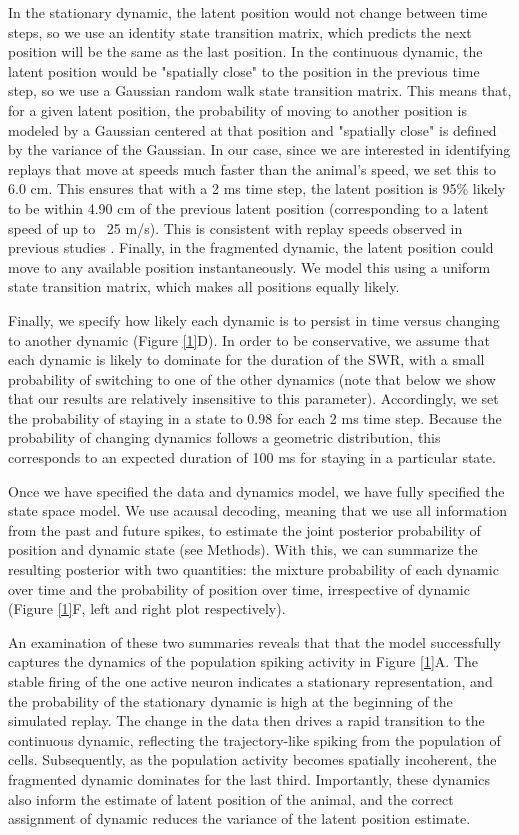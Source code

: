 \documentclass[times, twoside]{zHenriquesLab-StyleBioRxiv}
\begin{document}
In the stationary dynamic, the latent position would not change between time steps, so we use an identity state transition matrix, which predicts the next position will be the same as the last position. In the continuous dynamic, the latent position would be "spatially close" to the position in the previous time step, so we use a Gaussian random walk state transition matrix. This means that, for a given latent position, the probability of moving to another position is modeled by a Gaussian centered at that position and "spatially close" is defined by the variance of the Gaussian. In our case, since we are interested in identifying replays that move at speeds much faster than the animal's speed, we set this to 6.0 cm. This ensures that with a 2 ms time step, the latent position is 95\% likely to be within 4.90 cm of the previous latent position (corresponding to a latent speed of up to ~25 m/s). This is consistent with replay speeds observed in previous studies \cite{DavidsonHippocampalReplayExtended2009, PfeifferAutoassociativedynamicsgeneration2015}. Finally, in the fragmented dynamic, the latent position could move to any available position instantaneously. We model this using a uniform state transition matrix, which makes all positions equally likely.

Finally, we specify how likely each dynamic is to persist in time versus changing to another dynamic (Figure \ref{1}D). In order to be conservative, we assume that each dynamic is likely to dominate for the duration of the SWR, with a small probability of switching to one of the other dynamics (note that below we show that our results are relatively insensitive to this parameter). Accordingly, we set the probability of staying in a state to 0.98 for each 2 ms time step. Because the probability of changing dynamics follows a geometric distribution, this corresponds to an expected duration of 100 ms for staying in a particular state.

Once we have specified the data and dynamics model, we have fully specified the state space model. We use acausal decoding, meaning that we use all information from the past and future spikes, to estimate the joint posterior probability of position and dynamic state (see Methods). With this, we can summarize the resulting posterior with two quantities: the mixture probability of each dynamic over time and the probability of position over time, irrespective of dynamic (Figure \ref{1}F, left and right plot respectively). 

An examination of these two summaries reveals that that the model successfully captures the dynamics of the population spiking activity in Figure \ref{1}A. The stable firing of the one active neuron indicates a stationary representation, and the probability of the stationary dynamic is high at the beginning of the simulated replay. The change in the data then drives a rapid transition to the continuous dynamic, reflecting the trajectory-like spiking from the population of cells. Subsequently, as the population activity becomes spatially incoherent, the fragmented dynamic dominates for the last third. Importantly, these dynamics also inform the estimate of latent position of the animal, and the correct assignment of dynamic reduces the variance of the latent position estimate.
\end{document}
